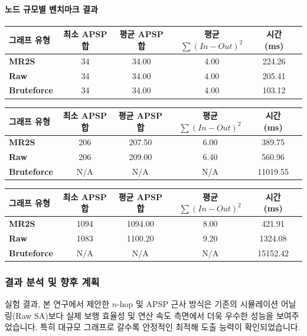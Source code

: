 \documentclass[11pt,a4paper]{article}
\begin{document}
\paragraph{노드 규모별 벤치마크 결과}
\begin{table}[ht]
\centering
{}
\begin{tabular}{|l|c|c|c|c|c|}
    \hline
    그래프 유형 & 최소 APSP 합 & 평균 APSP 합 & 평균 $\sum(In-Out)^2$ & 시간(ms) \\ \hline
    \textbf{MR2S} & 34 & 34.00 & 4.00 & 224.26 \\ \hline
    \textbf{Raw} & 34 & 34.00 & 4.00 & 205.41 \\ \hline
    \textbf{Bruteforce} & 34 & 34.00 & 4.00 & 103.12 \\ \hline
\end{tabular}

\vspace{0.3cm}
\begin{tabular}{|l|c|c|c|c|c|}
    \hline
    그래프 유형 & 최소 APSP 합 & 평균 APSP 합 & 평균 $\sum(In-Out)^2$ & 시간(ms) \\ \hline
    \textbf{MR2S} & 206 & 207.50 & 6.00 & 389.75 \\ \hline
    \textbf{Raw} & 206 & 209.00 & 6.40 & 560.96 \\ \hline
    \textbf{Bruteforce} & N/A & N/A & N/A & 11019.55 \\ \hline
\end{tabular}

\vspace{0.3cm}
\begin{tabular}{|l|c|c|c|c|c|}
    \hline
    그래프 유형 & 최소 APSP 합 & 평균 APSP 합 & 평균 $\sum(In-Out)^2$ & 시간(ms) \\ \hline
    \textbf{MR2S} & 1094 & 1094.00 & 8.00 & 421.91 \\ \hline
    \textbf{Raw} & 1083 & 1100.20 & 9.20 & 1324.08 \\ \hline
    \textbf{Bruteforce} & N/A & N/A & N/A & 15152.42 \\ \hline
\end{tabular}
\end{table}

\subsubsection{결과 분석 및 향후 계획}
실험 결과, 본 연구에서 제안한 $n$-hop 및 APSP 근사 방식은 기존의 시뮬레이션 어닐링(Raw SA)보다 실제 보행 효율성 및 연산 속도 측면에서 더욱 우수한 성능을 보여주었습니다. 특히 대규모 그래프로 갈수록 안정적인 최적해 도출 능력이 확인되었습니다.
\end{document}
